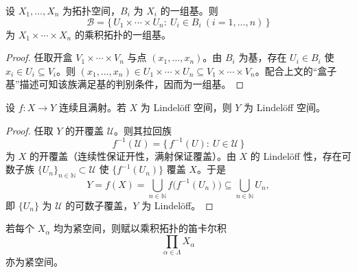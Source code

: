 \documentclass[lang=cn,a4paper,newtx,figureplace=section,tableplace=section]{elegantbook}
\begin{document}
 \begin{proposition}[推论：有限乘积的基]\label{prop:finite-product-basis}
  设 $X_1,\dots,X_n$ 为拓扑空间，$B_i$ 为 $X_i$ 的一组基。则
  \[
   \mathcal{B}=\{\,U_1\times\cdots\times U_n:\ U_i\in B_i\ (i=1,\dots,n)\,\}
  \]
  为 $X_1\times\cdots\times X_n$ 的乘积拓扑的一组基。
 \end{proposition}
 \begin{proof}
  任取开盒 $V_1\times\cdots\times V_n$ 与点 $(x_1,\dots,x_n)$。由 $B_i$ 为基，存在 $U_i\in B_i$ 使 $x_i\in U_i\subseteq V_i$。则
  $(x_1,\dots,x_n)\in U_1\times\cdots\times U_n\subseteq V_1\times\cdots\times V_n$。配合上文的“盒子基”描述可知该族满足基的判别条件，因而为一组基。
  \end{proof}
  
 \begin{proposition}\label{prop:lindeloff-image}
  设 $f:X\to Y$ 连续且满射。若 $X$ 为 Lindelöff 空间，则 $Y$ 为 Lindelöff 空间。
 \end{proposition}
 \begin{proof}
  任取 $Y$ 的开覆盖 $\mathcal U$。则其拉回族
  \[
   f^{-1}(\mathcal U)=\{\,f^{-1}(U):\ U\in\mathcal U\,\}
  \]
  为 $X$ 的开覆盖（连续性保证开性，满射保证覆盖）。由 $X$ 的 Lindelöff 性，存在可数子族 $\{U_n\}_{n\in\mathbb N}\subset\mathcal U$ 使 $\{f^{-1}(U_n)\}$ 覆盖 $X$。于是
  \[
   Y=f(X)=\bigcup_{n\in\mathbb N} f\big(f^{-1}(U_n)\big)\subseteq\bigcup_{n\in\mathbb N} U_n,
  \]
  即 $\{U_n\}$ 为 $\mathcal U$ 的可数子覆盖，$Y$ 为 Lindelöff。
 \end{proof}
  
  \begin{theorem}[Tychonoff 定理]\label{thm:tychonoff}
  若每个 $X_\alpha$ 均为紧空间，则赋以乘积拓扑的笛卡尔积
  \[
   \prod_{\alpha\in\Lambda} X_\alpha
  \]
  亦为紧空间。
 \end{theorem}
 
\end{document}
